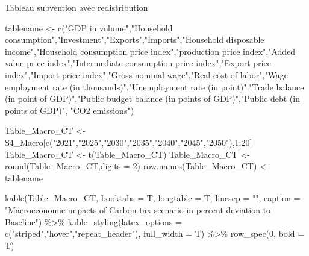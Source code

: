 \documentclass[
]{article}
\newenvironment{Shaded}{\begin{snugshade}}{\end{snugshade}}
\newcommand{\AttributeTok}[1]{\textcolor[rgb]{0.77,0.63,0.00}{#1}}
\newcommand{\DecValTok}[1]{\textcolor[rgb]{0.00,0.00,0.81}{#1}}
\newcommand{\FunctionTok}[1]{\textcolor[rgb]{0.00,0.00,0.00}{#1}}
\newcommand{\NormalTok}[1]{#1}
\newcommand{\OtherTok}[1]{\textcolor[rgb]{0.56,0.35,0.01}{#1}}
\newcommand{\SpecialCharTok}[1]{\textcolor[rgb]{0.00,0.00,0.00}{#1}}
\newcommand{\StringTok}[1]{\textcolor[rgb]{0.31,0.60,0.02}{#1}}
\begin{document}
Tableau subvention avec redistribution

\begin{Shaded}
\begin{Highlighting}[]
\NormalTok{tablename }\OtherTok{\textless{}{-}} \FunctionTok{c}\NormalTok{(}\StringTok{"GDP in volume"}\NormalTok{,}\StringTok{"Household consumption"}\NormalTok{,}\StringTok{"Investment"}\NormalTok{,}\StringTok{"Exports"}\NormalTok{,}\StringTok{"Imports"}\NormalTok{,}\StringTok{"Household disposable income"}\NormalTok{,}\StringTok{"Household consumption price index"}\NormalTok{,}\StringTok{"production price index"}\NormalTok{,}\StringTok{"Added value price index"}\NormalTok{,}\StringTok{"Intermediate consumption price index"}\NormalTok{,}\StringTok{"Export price index"}\NormalTok{,}\StringTok{"Import price index"}\NormalTok{,}\StringTok{"Gross nominal wage"}\NormalTok{,}\StringTok{"Real cost of labor"}\NormalTok{,}\StringTok{"Wage employment rate (in thousands)"}\NormalTok{,}\StringTok{"Unemployment rate (in point)"}\NormalTok{,}\StringTok{"Trade balance (in point of GDP)"}\NormalTok{,}\StringTok{"Public budget balance (in points of GDP)"}\NormalTok{,}\StringTok{"Public debt (in points of GDP)"}\NormalTok{, }\StringTok{"CO2 emissions"}\NormalTok{)}

\NormalTok{Table\_Macro\_CT }\OtherTok{\textless{}{-}}\NormalTok{ S4\_Macro[}\FunctionTok{c}\NormalTok{(}\StringTok{"2021"}\NormalTok{,}\StringTok{"2025"}\NormalTok{,}\StringTok{"2030"}\NormalTok{,}\StringTok{"2035"}\NormalTok{,}\StringTok{"2040"}\NormalTok{,}\StringTok{"2045"}\NormalTok{,}\StringTok{"2050"}\NormalTok{),}\DecValTok{1}\SpecialCharTok{:}\DecValTok{20}\NormalTok{]}
\NormalTok{Table\_Macro\_CT }\OtherTok{\textless{}{-}} \FunctionTok{t}\NormalTok{(Table\_Macro\_CT)}
\NormalTok{Table\_Macro\_CT }\OtherTok{\textless{}{-}} \FunctionTok{round}\NormalTok{(Table\_Macro\_CT,}\AttributeTok{digits =} \DecValTok{2}\NormalTok{)}
\FunctionTok{row.names}\NormalTok{(Table\_Macro\_CT) }\OtherTok{\textless{}{-}}\NormalTok{ tablename}

\FunctionTok{kable}\NormalTok{(Table\_Macro\_CT, }\AttributeTok{booktabs =}\NormalTok{ T, }\AttributeTok{longtable =}\NormalTok{ T, }\AttributeTok{linesep =} \StringTok{""}\NormalTok{, }\AttributeTok{caption =} \StringTok{"Macroeconomic impacts of Carbon tax scenario in percent deviation to Baseline"}\NormalTok{) }\SpecialCharTok{\%\textgreater{}\%} 
\FunctionTok{kable\_styling}\NormalTok{(}\AttributeTok{latex\_options =} \FunctionTok{c}\NormalTok{(}\StringTok{"striped"}\NormalTok{,}\StringTok{"hover"}\NormalTok{,}\StringTok{"repeat\_header"}\NormalTok{), }\AttributeTok{full\_width =}\NormalTok{ T) }\SpecialCharTok{\%\textgreater{}\%} 
\FunctionTok{row\_spec}\NormalTok{(}\DecValTok{0}\NormalTok{, }\AttributeTok{bold =}\NormalTok{ T)}
\end{Highlighting}
\end{Shaded}
\end{document}
